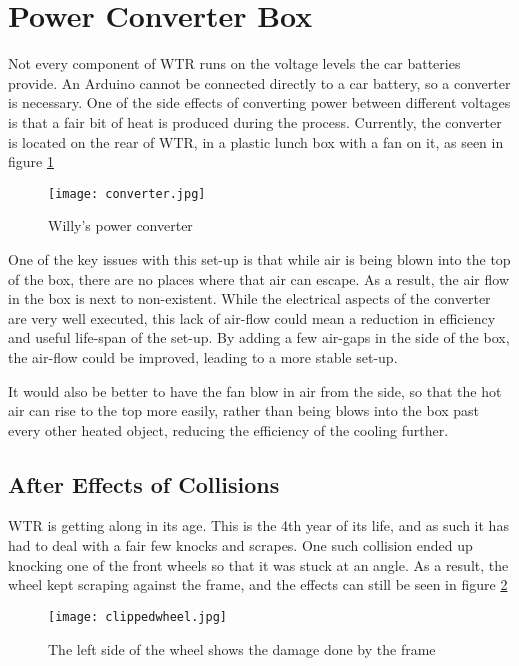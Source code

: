 \section{Power Converter Box}
Not every component of WTR runs on the voltage levels the car batteries provide.
An Arduino cannot be connected directly to a car battery, so a converter is necessary.
One of the side effects of converting power between different voltages is that a fair bit of heat is produced during the process.
Currently, the converter is located on the rear of WTR, in a plastic lunch box with a fan on it, as seen in figure \ref{fig::converter}

\begin{figure}[H]
\centering
\texttt{[image: converter.jpg]}
\caption{Willy's power converter}
\label{fig::converter}
\end{figure}

One of the key issues with this set-up is that while air is being blown into the top of the box, there are no places where that air can escape.
As a result, the air flow in the box is next to non-existent.
While the electrical aspects of the converter are very well executed, this lack of air-flow could mean a reduction in efficiency and useful life-span of the set-up.
By adding a few air-gaps in the side of the box, the air-flow could be improved, leading to a more stable set-up.

It would also be better to have the fan blow in air from the side, so that the hot air can rise to the top more easily, rather than being blows into the box past every other heated object, reducing the efficiency of the cooling further.


\subsection{After Effects of Collisions}
WTR is getting along in its age.
This is the 4th year of its life, and as such it has had to deal with a fair few knocks and scrapes.
One such collision ended up knocking one of the front wheels so that it was stuck at an angle.
As a result, the wheel kept scraping against the frame, and the effects can still be seen in figure \ref{fig::wheelclip}

\begin{figure}[H]
\centering
\texttt{[image: clippedwheel.jpg]}
\caption{The left side of the wheel shows the damage done by the frame}
\label{fig::wheelclip}
\end{figure}

